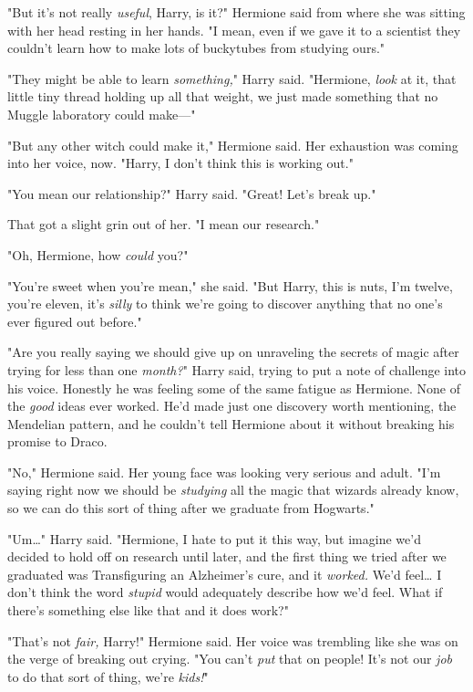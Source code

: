 "But it's not really \emph{useful}, Harry, is it?" Hermione said from where she 
was sitting with her head resting in her hands. "I mean, even if we gave it to 
a scientist they couldn't learn how to make lots of buckytubes from studying 
ours."

"They might be able to learn \emph{something,}" Harry said. "Hermione, 
\emph{look} at it, that little tiny thread holding up all that weight, we just 
made something that no Muggle laboratory could make---"

"But any other witch could make it," Hermione said. Her exhaustion was coming 
into her voice, now. "Harry, I don't think this is working out."

"You mean our relationship?" Harry said. "Great! Let's break up."

That got a slight grin out of her. "I mean our research."

"Oh, Hermione, how \emph{could} you?"

"You're sweet when you're mean," she said. "But Harry, this is nuts, I'm 
twelve, you're eleven, it's \emph{silly} to think we're going to discover 
anything that no one's ever figured out before."

"Are you really saying we should give up on unraveling the secrets of magic 
after trying for less than one \emph{month?}" Harry said, trying to put a note 
of challenge into his voice. Honestly he was feeling some of the same fatigue 
as Hermione. None of the \emph{good} ideas ever worked. He'd made just one 
discovery worth mentioning, the Mendelian pattern, and he couldn't tell 
Hermione about it without breaking his promise to Draco.

"No," Hermione said. Her young face was looking very serious and adult. "I'm 
saying right now we should be \emph{studying} all the magic that wizards 
already know, so we can do this sort of thing after we graduate from Hogwarts."

"Um{\ldots}" Harry said. "Hermione, I hate to put it this way, but imagine we'd 
decided to hold off on research until later, and the first thing we tried after 
we graduated was Transfiguring an Alzheimer's cure, and it \emph{worked.} We'd 
feel{\ldots} I don't think the word \emph{stupid} would adequately describe how 
we'd feel. What if there's something else like that and it does work?"

"That's not \emph{fair,} Harry!" Hermione said. Her voice was trembling like 
she was on the verge of breaking out crying. "You can't \emph{put} that on 
people! It's not our \emph{job} to do that sort of thing, we're \emph{kids!}"

